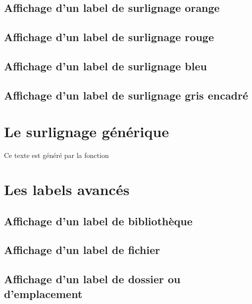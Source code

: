 \subsection{Affichage d'un label de surlignage orange}

\subsection{Affichage d'un label de surlignage rouge}

\subsection{Affichage d'un label de surlignage bleu}

\subsection{Affichage d'un label de surlignage gris encadré}


\section{Le surlignage générique}


Ce texte est généré par la fonction 

\section{Les labels avancés}

\subsection{Affichage d'un label de bibliothèque}

\subsection{Affichage d'un label de fichier}

\subsection{Affichage d'un label de dossier ou d'emplacement}

